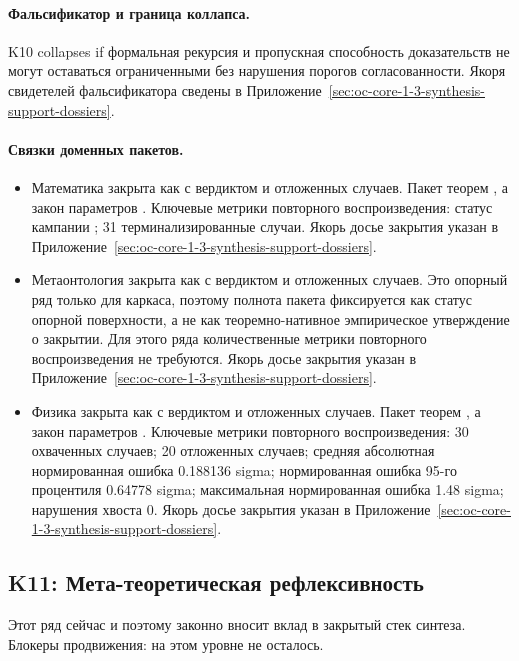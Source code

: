 \paragraph{Фальсификатор и граница коллапса.}
K10 collapses if формальная рекурсия и пропускная способность доказательств не могут оставаться ограниченными без нарушения порогов согласованности.
Якоря свидетелей фальсификатора сведены в Приложение~\ref{sec:oc-core-1-3-synthesis-support-dossiers}.

\paragraph{Связки доменных пакетов.}
\begin{itemize}[leftmargin=1.6em,nosep]
\item Математика закрыта как  с вердиктом  и  отложенных случаев. Пакет теорем , а закон параметров . Ключевые метрики повторного воспроизведения: статус кампании ; 31 терминализированные случаи. Якорь досье закрытия указан в Приложение~\ref{sec:oc-core-1-3-synthesis-support-dossiers}.
\item Метаонтология закрыта как  с вердиктом  и  отложенных случаев. Это опорный ряд только для каркаса, поэтому полнота пакета фиксируется как статус опорной поверхности, а не как теоремно-нативное эмпирическое утверждение о закрытии. Для этого ряда количественные метрики повторного воспроизведения не требуются. Якорь досье закрытия указан в Приложение~\ref{sec:oc-core-1-3-synthesis-support-dossiers}.
\item Физика закрыта как  с вердиктом  и  отложенных случаев. Пакет теорем , а закон параметров . Ключевые метрики повторного воспроизведения: 30 охваченных случаев; 20 отложенных случаев; средняя абсолютная нормированная ошибка 0.188136 sigma; нормированная ошибка 95-го процентиля 0.64778 sigma; максимальная нормированная ошибка 1.48 sigma; нарушения хвоста 0. Якорь досье закрытия указан в Приложение~\ref{sec:oc-core-1-3-synthesis-support-dossiers}.
\end{itemize}

\subsection{K11: Мета-теоретическая рефлексивность}
\label{sec:oc-core-1-3-synthesis-k11}
Этот ряд сейчас  и поэтому законно вносит вклад в закрытый стек синтеза.
Блокеры продвижения: на этом уровне не осталось.

